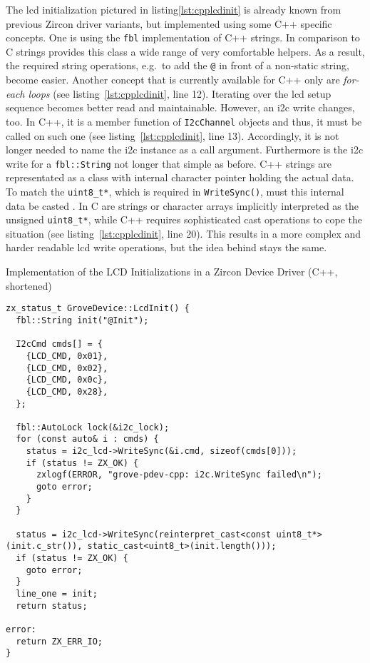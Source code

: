 The \ac{lcd} initialization pictured in listing\ref{lst:cpplcdinit} is already known from previous Zircon driver variants, but implemented using some C++ specific concepts.
One is using the \texttt{fbl} implementation of C++ strings.
In comparison to C strings provides this class a wide range of very comfortable helpers.
As a result, the required string operations, e.g.\ to add the \texttt{@} in front of a non-static string, become easier.
Another concept that is currently available for C++ only are \textit{for-each loops} (see listing~\ref{lst:cpplcdinit}, line 12).
Iterating over the \ac{lcd} setup sequence becomes better read and maintainable.
However, an \ac{i2c} write changes, too.
In C++, it is a member function of \texttt{I2cChannel} objects and thus, it must be called on such one (see listing~\ref{lst:cpplcdinit}, line 13).
Accordingly, it is not longer needed to name the \ac{i2c} instance as a call argument.
Furthermore is the \ac{i2c} write for a \texttt{fbl::String} not longer that simple as before.
C++ strings are representated as a class with internal character pointer holding the actual data.
To match the \texttt{uint8_t*}, which is required in \texttt{WriteSync()}, must this internal data be casted .
In C are strings or character arrays implicitly interpreted as the unsigned \texttt{uint8_t*}, while C++ requires sophisticated cast operations to cope the situation (see listing~\ref{lst:cpplcdinit}, line 20).
This results in a more complex and harder readable \ac{lcd} write operations, but the idea behind stays the same.

\begin{listing} [H]
    \caption{Implementation of the LCD Initializations in a Zircon Device Driver (C++, shortened)}
\label{lst:cpplcdinit}
\begin{verbatim}
zx_status_t GroveDevice::LcdInit() {
  fbl::String init("@Init");

  I2cCmd cmds[] = {
    {LCD_CMD, 0x01},
    {LCD_CMD, 0x02},
    {LCD_CMD, 0x0c},
    {LCD_CMD, 0x28},
  };

  fbl::AutoLock lock(&i2c_lock);
  for (const auto& i : cmds) {
    status = i2c_lcd->WriteSync(&i.cmd, sizeof(cmds[0]));
    if (status != ZX_OK) {
      zxlogf(ERROR, "grove-pdev-cpp: i2c.WriteSync failed\n");
      goto error;
    }
  }

  status = i2c_lcd->WriteSync(reinterpret_cast<const uint8_t*>(init.c_str()), static_cast<uint8_t>(init.length()));
  if (status != ZX_OK) {
    goto error;
  }
  line_one = init;
  return status;

error:
  return ZX_ERR_IO;
}
\end{verbatim}
\end{listing}


